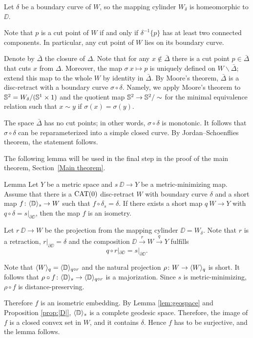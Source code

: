 Let $\delta$ be a boundary curve of $W$, so the mapping cylinder $W_\delta$ is homeomorphic to $\DD$.

Note that $p$ is a cut point of $W$ if and only if $\delta^{-1}\{p\}$ has at least two connected components.
In particular, any cut point of $W$ lies on its boundary curve.

Denote by $\bar\Delta$ the closure of $\Delta$.
Note that for any $x\notin\bar\Delta$ there is a cut point $p\in\bar\Delta$ that cuts $x$ from $\Delta$.
Moreover, the map $\sigma\:x\mapsto p$ is uniquely defined on $W\backslash\bar\Delta$;
extend this map to the whole $W$ by identity in $\bar\Delta$.
By Moore's theorem, $\bar\Delta$ is a disc-retract with a boundary curve $\sigma\circ\delta$.
Namely, we apply Moore's theorem to $\mathbb{S}^2= W_\delta/(\mathbb{S}^1\times 1)$ and the quotient map $\mathbb{S}^2\to \mathbb{S}^2/\sim$ for the minimal equivalence relation such that $x\sim y$ if $\sigma(x)=\sigma(y)$.

The space $\bar\Delta$ has no cut points; in other words, $\sigma\circ\delta$ is monotonic.
It follows that $\sigma\circ\delta$ can be reparameterized into a simple closed curve.
By Jordan--Schoenflies theorem, the statement follows.
\qeds

The following lemma will be used in the final step in the proof of the main theorem, Section~\ref{Main theorem}.

\begin{thm}{Lemma}\label{lem:maj is isom}
Let $Y$ be a metric space and $s\:\DD\to Y$ be a metric-minimizing map.
Assume that there is a $\mathop{\rm CAT}\nolimits(0)$ disc-retract $W$ with boundary curve $\delta$ and a short map $f\colon\langle\mathbb{D}\rangle_s \to W$
such that $f\circ \delta_s=\delta$. If there exists a short map 
$q\: W\to Y$ with $q\circ \delta=s|_{\partial \DD}$, then the map $f$ is an isometry.
\end{thm}

Let $r\:\DD\to W$ be the projection from the mapping cylinder $\DD=W_\delta$. 
Note that $r$ is a retraction, $r|_{\partial \DD}=\delta$ and the composition $\DD\xrightarrow{r}W\xrightarrow{q} Y$ fulfills \[q\circ r|_{\partial \DD}=s|_{\partial \DD}.\]

Note that  $\langle W\rangle_q=\langle\mathbb{D}\rangle_{q\circ r}$ and the natural projection $\rho\colon W\to \langle W\rangle_q$ is short.
It follows that $\rho\circ f\colon \langle\mathbb{D}\rangle_s\to \langle\mathbb{D}\rangle_{q\circ r}$ is a majorization.
Since $s$ is metric-minimizing, $\rho\circ f$ is distance-preserving. 

Therefore $f$ is an isometric embedding. 
By Lemma \ref{lem:geospace} and Proposition \ref{prop:|D|}, $\langle\mathbb{D}\rangle_s$ is a complete geodesic space.
Therefore, the image of $f$ is a closed convex set in $W$, and it contains $\delta$.
Hence $f$ has to be surjective, and the lemma follows.
\qeds
